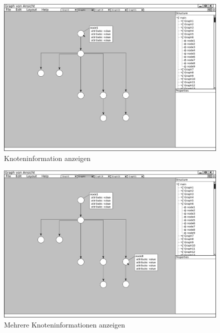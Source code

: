 \begin{figure}[ht]
  \centering
  \includegraphics[width=380pt]{resourcen/gui_view_showInfoInView_node.png}
  \caption{Knoteninformation anzeigen}
  \label{fig:gui_view_showInfoInView_node}
\end{figure}

\begin{figure}[hb]
  \centering
  \includegraphics[width=380pt]{resourcen/gui_view_showInfoInView_node_multi.png}
  \caption{Mehrere Knoteninformationen anzeigen}
  \label{fig:gui_view_showInfoInView_node_multi}
\end{figure}

